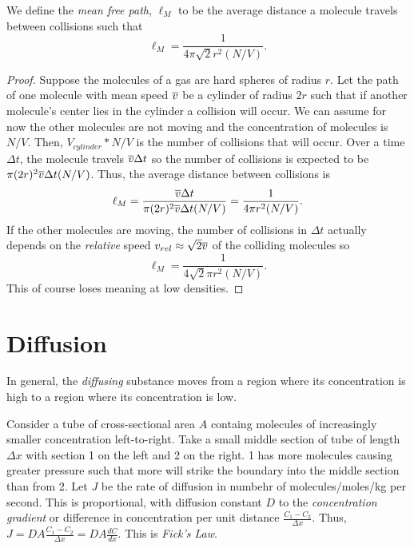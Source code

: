 \begin{definition}
    We define the \emph{mean free path}, $\ell_M$ to be the average distance a molecule travels between collisions such that $$\ell_M = \frac{1}{4\pi\sqrt{2}r^2(N/V)}.$$
\end{definition}
\begin{proof}
    Suppose the molecules of a gas are hard spheres of radius $r$. Let the path of one molecule with mean speed $\overline{v}$ be a cylinder of radius $2r$ such that if another molecule's center lies in the cylinder a collision will occur. We can assume for now the other molecules are not moving and the concentration of molecules is $N/V$. Then, $V_{cylinder} * N/V$ is the number of collisions that will occur. Over a time $\Delta t$, the molecule travels $\overline{v}\Delta t$ so the number of collisions is expected to be $\pi(2r)^2\overline{v}\Delta t(N/V)$. Thus, the average distance between collisions is $$\ell_M = \frac{\overline{v}\Delta t}{\pi(2r)^2\overline{v}\Delta t(N/V)} = \frac{1}{4\pi r^2(N/V)}.$$ If the other molecules are moving, the number of collisions in $\Delta t$ actually depends on the \emph{relative} speed $v_{rel} \approx \sqrt{2}\overline{v}$ of the colliding molecules so $$\ell_M = \frac{1}{4\sqrt{2}\pi r^2(N/V)}.$$ This of course loses meaning at low densities.
\end{proof}

\section{Diffusion}

\begin{definition}[Diffusion]
    In general, the \emph{diffusing} substance moves from a region where its concentration is high to a region where its concentration is low.
\end{definition}
\begin{definition}
    Consider a tube of cross-sectional area $A$ containg molecules of increasingly smaller concentration left-to-right. Take a small middle section of tube of length $\Delta x$ with section 1 on the left and 2 on the right. 1 has more molecules causing greater pressure such that more will strike the boundary into the middle section than from 2. Let $J$ be the rate of diffusion in numbehr of molecules/moles/kg per second. This is proportional, with diffusion constant $D$ to the \emph{concentration gradient} or difference in concentration per unit distance $\frac{C_1-C_2}{\Delta x}$. Thus, $J = DA\frac{C_1-C_2}{\Delta x} = DA\frac{dC}{dx}$. This is \emph{Fick's Law}.
\end{definition}